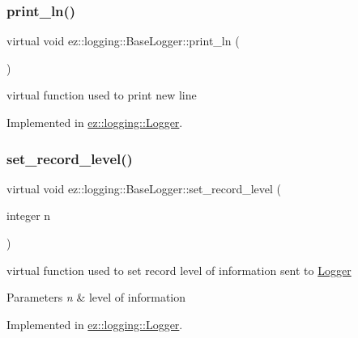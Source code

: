 \subsubsection{\texorpdfstring{print\+\_\+ln()}{print\_ln()}}
{\footnotesize\ttfamily virtual void ez\+::logging\+::\+Base\+Logger\+::print\+\_\+ln (\begin{DoxyParamCaption}{ }\end{DoxyParamCaption})\hspace{0.3cm}{\ttfamily [pure virtual]}}

virtual function used to print new line 

Implemented in \hyperlink{classez_1_1logging_1_1Logger_ab8e5b19223eca4b3af5ff7df2db607b7}{ez\+::logging\+::\+Logger}.

\mbox{\label{classez_1_1logging_1_1BaseLogger_a508a25672c704ec73260978b7f17dd13}} 
\subsubsection{\texorpdfstring{set\+\_\+record\+\_\+level()}{set\_record\_level()}}
{\footnotesize\ttfamily virtual void ez\+::logging\+::\+Base\+Logger\+::set\+\_\+record\+\_\+level (\begin{DoxyParamCaption}\item[{integer}]{n }\end{DoxyParamCaption})\hspace{0.3cm}{\ttfamily [pure virtual]}}

virtual function used to set record level of information sent to \hyperlink{classez_1_1logging_1_1Logger}{Logger} 
\begin{DoxyParams}{Parameters}
{\em n} & level of information \\
\hline
\end{DoxyParams}


Implemented in \hyperlink{classez_1_1logging_1_1Logger_a64bfdfc5a20a7ee660144c50dfd0514e}{ez\+::logging\+::\+Logger}.

\mbox{\label{classez_1_1logging_1_1BaseLogger_a2b9ecfbaff4e53d15b3b8bedd53ea2f8}} 
